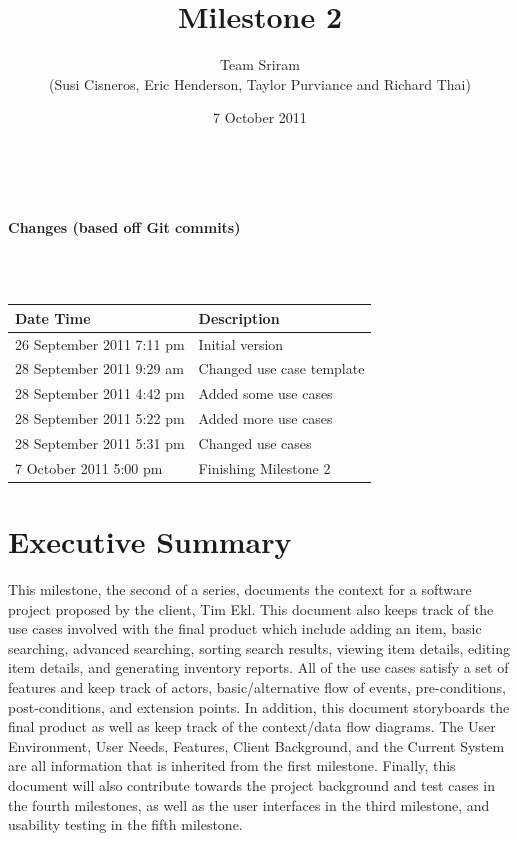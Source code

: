 \documentclass{article}
\begin{document}
\setlength{\voffset}{3.5in}
\title{Milestone 2}
\author{Team Sriram\\
(Susi Cisneros, Eric Henderson, Taylor Purviance and Richard Thai)}
\date{7 October 2011}
\maketitle
\clearpage
\setlength{\voffset}{0pt}
\tableofcontents
\clearpage
~\\
\begin{Large}\textbf{Changes (based off Git commits)}\end{Large}\\
~\\
\begin{tabular}{ | p{2in} | p{4.5in} | }
\hline
\textbf{Date Time} & \textbf{Description}\\
\hline
\hline
26 September 2011 7:11 pm & Initial version\\
\hline
28 September 2011 9:29 am & Changed use case template\\
\hline
28 September 2011 4:42 pm & Added some use cases\\
\hline
28 September 2011 5:22 pm & Added more use cases\\
\hline
28 September 2011 5:31 pm & Changed use cases\\
\hline
7 October 2011 5:00 pm & Finishing Milestone 2\\
\hline
\end{tabular}
\clearpage

\section{Executive Summary}
This milestone, the second of a series, documents the context for a software project proposed by the client, Tim Ekl. This document also keeps track of the use cases involved with the final product which include adding an item, basic searching, advanced searching, sorting search results, viewing item details, editing item details, and generating inventory reports. All of the use cases satisfy a set of features and keep track of actors, basic/alternative flow of events, pre-conditions, post-conditions, and extension points. In addition, this document storyboards the final product as well as keep track of the context/data flow diagrams.  The User Environment, User Needs, Features, Client Background, and the Current System are all information that is inherited from the first milestone.  Finally, this document will also contribute towards the project background and test cases in the fourth milestones, as well as the user interfaces in the third milestone, and usability testing in the fifth milestone.
\end{document}
